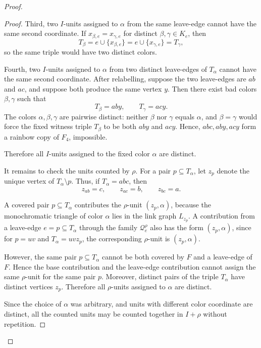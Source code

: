 \documentclass[10pt,a4paper]{article}
\theoremstyle{definition}
\begin{document}
\begin{proof}
\begin{proof}
        Third, two $I$-units assigned to $\alpha$ from the same leave-edge
        cannot have the same second coordinate.  If
        $x_{\beta,e}=x_{\gamma,e}$ for distinct $\beta,\gamma\in K_e$, then
        \[
            T_\beta=e\cup\{x_{\beta,e}\}
            =
            e\cup\{x_{\gamma,e}\}
            =
            T_\gamma,
        \]
        so the same triple would have two distinct colors.

        Fourth, two $I$-units assigned to $\alpha$ from two distinct
        leave-edges of $T_\alpha$ cannot have the same second coordinate.
        After relabelling, suppose the two leave-edges are $ab$ and $ac$, and
        suppose both produce the same vertex $y$.  Then there exist bad colors
        $\beta,\gamma$ such that
        \[
            T_\beta=aby,
            \qquad
            T_\gamma=acy.
        \]
        The colors $\alpha,\beta,\gamma$ are pairwise distinct: neither
        $\beta$ nor $\gamma$ equals $\alpha$, and $\beta=\gamma$ would force
        the fixed witness triple $T_\beta$ to be both $aby$ and $acy$.
        Hence, $abc,aby,acy$ form a rainbow copy of $F_4$, impossible.

        Therefore all $I$-units assigned to the fixed color $\alpha$ are
        distinct.

        It remains to check the units counted by $\rho$.  For a pair
        $p\subseteq T_\alpha$, let $z_p$ denote the unique vertex of $T_\alpha\setminus p$.
        Thus, if $T_\alpha=abc$, then
        \[
            z_{ab}=c,\qquad z_{ac}=b,\qquad z_{bc}=a.
        \]

        A covered pair $p\subseteq T_\alpha$ contributes the $\rho$-unit $(z_p,\alpha)$,
        because the monochromatic triangle of color $\alpha$ lies in the link graph $L_{z_p}$.
        A contribution from a leave-edge
        $e=p\subseteq T_\alpha$ through the family $\mathcal Q_e^\rho$ also
        has the form $(z_p,\alpha)$,
        since for $p=uv$ and $T_\alpha=uvz_p$, the corresponding
        $\rho$-unit is $(z_p,\alpha)$.

        However, the same pair $p\subseteq T_\alpha$ cannot be both covered by
        $F$ and a leave-edge of $F$.  Hence the base contribution and the
        leave-edge contribution cannot assign the same $\rho$-unit for the
        same pair $p$.  Moreover, distinct pairs of the triple $T_\alpha$ have
        distinct vertices $z_p$.  Therefore all $\rho$-units assigned to
        $\alpha$ are distinct.

        Since the choice of $\alpha$ was arbitrary, and units with different
        color coordinate are distinct, all the counted units may be counted
        together in $I+\rho$ without repetition.
    \end{proof}


\end{proof}
\end{document}
